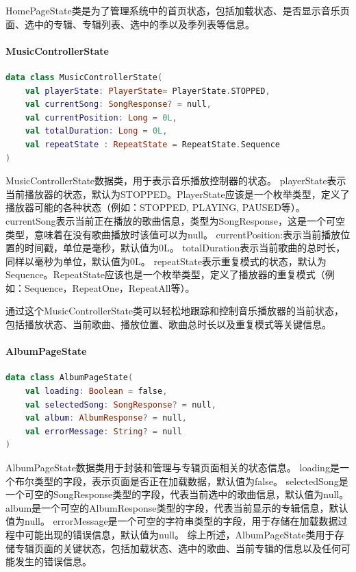 \documentclass[main.tex]{subfiles}
\begin{document}
HomePageState类是为了管理系统中的首页状态，包括加载状态、是否显示音乐页面、选中的专辑、专辑列表、选中的季以及季列表等信息。

\paragraph{MusicControllerState} 

\begin{lstlisting}[language=Kotlin]
data class MusicControllerState(
    val playerState: PlayerState= PlayerState.STOPPED,
    val currentSong: SongResponse? = null,
    val currentPosition: Long = 0L,
    val totalDuration: Long = 0L,
    val repeatState : RepeatState = RepeatState.Sequence
)
\end{lstlisting}

MusicControllerState数据类，用于表示音乐播放控制器的状态。
playerState表示当前播放器的状态，默认为STOPPED。PlayerState应该是一个枚举类型，定义了播放器可能的各种状态（例如：STOPPED, PLAYING, PAUSED等）。
currentSong表示当前正在播放的歌曲信息，类型为SongResponse，这是一个可空类型，意味着在没有歌曲播放时该值可以为null。
currentPosition:表示当前播放位置的时间戳，单位是毫秒，默认值为0L。
totalDuration表示当前歌曲的总时长，同样以毫秒为单位，默认值为0L。
repeatState表示重复模式的状态，默认为Sequence。RepeatState应该也是一个枚举类型，定义了播放器的重复模式（例如：Sequence，RepeatOne，RepeatAll等）。

通过这个MusicControllerState类可以轻松地跟踪和控制音乐播放器的当前状态，包括播放状态、当前歌曲、播放位置、歌曲总时长以及重复模式等关键信息。

\paragraph{AlbumPageState}

\begin{lstlisting}[language=Kotlin]
data class AlbumPageState(
    val loading: Boolean = false,
    val selectedSong: SongResponse? = null,
    val album: AlbumResponse? = null,
    val errorMessage: String? = null
)
\end{lstlisting}

AlbumPageState数据类用于封装和管理与专辑页面相关的状态信息。
loading是一个布尔类型的字段，表示页面是否正在加载数据，默认值为false。
selectedSong是一个可空的SongResponse类型的字段，代表当前选中的歌曲信息，默认值为null。
album是一个可空的AlbumResponse类型的字段，代表当前显示的专辑信息，默认值为null。
errorMessage是一个可空的字符串类型的字段，用于存储在加载数据过程中可能出现的错误信息，默认值为null。
综上所述，AlbumPageState类用于存储专辑页面的关键状态，包括加载状态、选中的歌曲、当前专辑的信息以及任何可能发生的错误信息。
\end{document}
